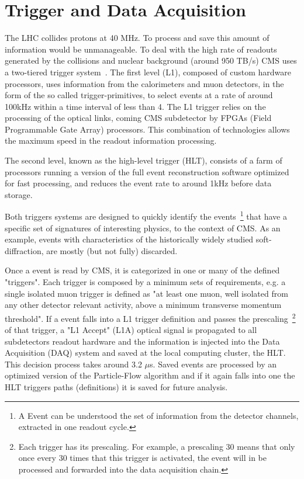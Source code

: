 
\section{Trigger and Data Acquisition}

The LHC collides protons at 40 MHz. To process and save this amount of information would be unmanageable. To deal with the high rate of readouts generated by the collisions and nuclear background (around 950 TB/s) CMS uses a two-tiered trigger system~\cite{Khachatryan:2016bia}. The first level (L1), composed of custom hardware processors, uses information from the calorimeters and muon detectors, in the form of the so called trigger-primitives, to select events at a rate of around 100\unit{kHz} within a time interval of less than 4\mus. The L1 trigger relies on the processing of the optical links, coming CMS subdetector by FPGAs (Field Programmable Gate Array) processors. This combination of technologies allows the maximum speed in the readout information processing.

The second level, known as the high-level trigger (HLT), consists of a farm of processors running a version of the full event reconstruction software optimized for fast processing, and reduces the event rate to around 1\unit{kHz} before data storage.

Both triggers systems are designed to quickly identify the events~\footnote{A Event can be understood the set of information from the detector channels, extracted in one readout cycle.} that have a specific set of signatures of interesting physics, to the context of CMS. As an example, events with characteristics of the historically widely studied soft-diffraction, are mostly (but not fully) discarded. 

Once a event is read by CMS, it is categorized in one or many of the defined "triggers". Each trigger is composed by a minimum sets of requirements, e.g. a single isolated muon trigger is defined as "at least one muon, well isolated from any other detector relevant activity, above a minimum transverse momentum threshold". If a event falls into a L1 trigger definition and passes the prescaling~\footnote{Each trigger has its prescaling. For example, a prescaling 30 means that only once every 30 times that this trigger is activated, the event will in be processed and forwarded into the data acquisition chain.} of that trigger, a "L1 Accept" (L1A) optical signal is propagated to all subdetectors readout hardware and the information is injected into the Data Acquisition (DAQ) system and saved at the local computing cluster, the HLT. This decision process takes around 3.2 $\mu$s. Saved events are processed by an optimized version of the Particle-Flow algorithm and if it again falls into one the HLT triggers paths (definitions) it is saved for future analysis.